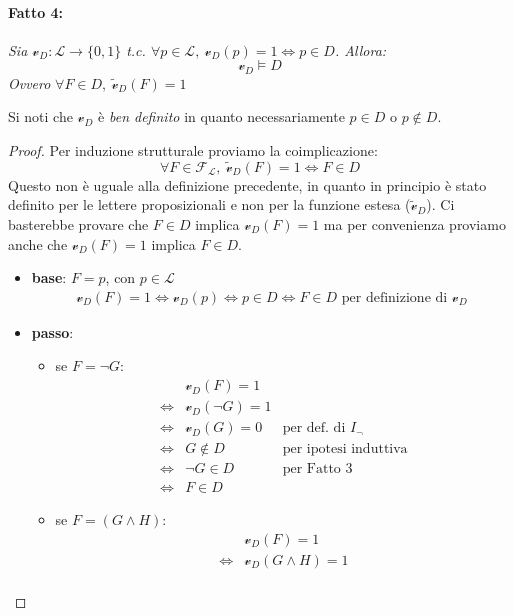\paragraph{Fatto 4:}
\textit{Sia $\mathcal{v}_D : \mathscr{L} \rightarrow \{0,1\}$ t.c. $\forall p \in \mathscr{L},\ \mathcal{v}_D(p) = 1 \iff p \in D$. Allora:}
$$
  \mathcal{v}_D \models D
$$
\textit{Ovvero} $\forall F \in D,\ \widetilde{\mathcal{v}}_D(F) = 1$

Si noti che $\mathcal{v}_D$ è \textit{ben definito} in quanto necessariamente $p \in D$ o $p \notin D$.

\begin{proof}
Per induzione strutturale proviamo la coimplicazione:
$$
  \forall F \in \mathscr{F_L},\ \widetilde{\mathcal{v}}_D(F) = 1 \iff F \in D
$$
Questo non è uguale alla definizione precedente, in quanto 
in principio è stato definito per le lettere proposizionali e non per la 
funzione estesa ($\widetilde{\mathcal{v}}_D$). Ci basterebbe provare che $F \in D$ 
implica $\mathcal{v}_D(F) = 1$ ma per convenienza proviamo anche che 
$\mathcal{v}_D(F) = 1$ implica $F \in D$. 
\begin{itemize}
  \item \textbf{base}: $F = p$, con $p \in \mathscr{L}$
  \begin{align*}
    \mathcal v_D(F) = 1 \iff \mathcal v_D(p) \iff p \in D \iff F \in D \text{ per definizione di }\mathcal{v}_D
  \end{align*}
  \item \textbf{passo}:
    \begin{itemize}
      \item se $F = \neg G: $
        \begin{align*}
          & \mathcal{v}_D(F) = 1 \\
          \iff & \mathcal v_D(\neg G) = 1 \\
          \iff & \mathcal{v}_D(G) = 0 & \text{per def. di }I_\neg\\
          \iff & G \notin D & \text{per ipotesi induttiva}\\
          \iff & \neg G \in D & \text{per Fatto 3} \\
          \iff & F \in D
        \end{align*}
      \item se $F = (G \land H):$
        \begin{align*}
          & \mathcal{v}_D(F) = 1 \\
          \iff & \mathcal{v}_D(G \land H) = 1 \\

\end{align*}
\end{itemize}
\end{itemize}
\end{proof}
